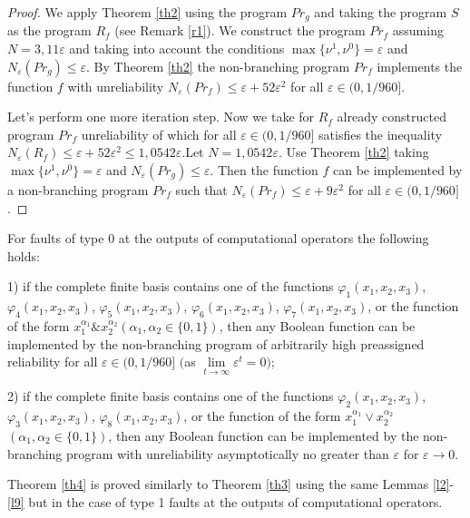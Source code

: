 \documentclass[
11pt,%
tightenlines,%
twoside,%
onecolumn,%
nofloats,%
nobibnotes,%
nofootinbib,%
superscriptaddress,%
noshowpacs,%
centertags]%
{revtex4}
\begin{document}
\begin{proof}
We apply Theorem \ref{th2} using the program $Pr_g$ and taking  the
program $S$ as the program $R_f$ (see Remark \ref{r1}). We construct
the program $Pr_f$ assuming $N = 3,11\varepsilon$ and taking into
account the conditions $\max\{\nu^1, \nu^0\}=\varepsilon$ and
$N_\varepsilon (Pr_g) \leq\varepsilon$. By Theorem \ref{th2} the
non-branching program $Pr_f$ implements the function $f$ with
unreliability $N_\varepsilon (Pr_f)\leq\varepsilon +
52\varepsilon^2$ for all $\varepsilon\in(0, 1/960]$.

Let's perform one more iteration step. Now we take for $R_f$ already
constructed program $Pr_f$ unreliability of which for all
$\varepsilon\in(0, 1/960]$ satisfies the inequality $N_\varepsilon
(R_f) \leq\varepsilon +
52\varepsilon^2\leq1,0542\varepsilon$.\linebreak Let $N =
1,0542\varepsilon$. Use Theorem \ref{th2} taking $\max\{\nu^1,
\nu^0\}=\varepsilon$ and $N_\varepsilon (Pr_g) \leq\varepsilon$.
Then the function $f$ can be implemented by a non-branching program
$Pr_f$ such that $N_\varepsilon (Pr_f) \leq\varepsilon +
9\varepsilon^2$ \linebreak for all $\varepsilon\in(0, 1/960]$.
\end{proof}

\begin{corollary}\label{c1} For faults of type 0 at the outputs of computational operators the following holds:

1) if the complete finite basis  contains one of the functions
$\varphi_1(x_1, x_2, x_3)$, $\varphi_4(x_1, x_2, x_3)$,
$\varphi_5(x_1, x_2, x_3)$, $\varphi_6(x_1, x_2, x_3)$,
$\varphi_7(x_1, x_2, x_3)$, or the function of the form
$x_1^{\alpha_1}\& x_2^{\alpha_2}$$(\alpha_1, \alpha_2\in\{0, 1\})$,
then any Boolean function can be implemented by the non-branching
program of arbitrarily high preassigned reliability for all
$\varepsilon\in(0, 1/960]$ $($as
$\lim\limits_{t\to\infty}\varepsilon^t=0)$;

2) if the complete finite basis contains one  of the functions
$\varphi_2(x_1, x_2, x_3)$, $\varphi_3(x_1, x_2, x_3)$,
$\varphi_8(x_1, x_2, x_3)$, or the function of the form
$x_1^{\alpha_1}\vee x_2^{\alpha_2}$$(\alpha_1, \alpha_2\in\{0,
1\})$, then any Boolean function can be implemented by the
non-branching program with unreliability asymptotically no greater
than $\varepsilon$ for $\varepsilon\to 0$.
\end{corollary}

Theorem \ref{th4} is proved similarly to Theorem \ref{th3} using
the same Lemmas \ref{l2}-\ref{l9} but in the case of type 1 faults
at the outputs of computational operators.
\end{document}
